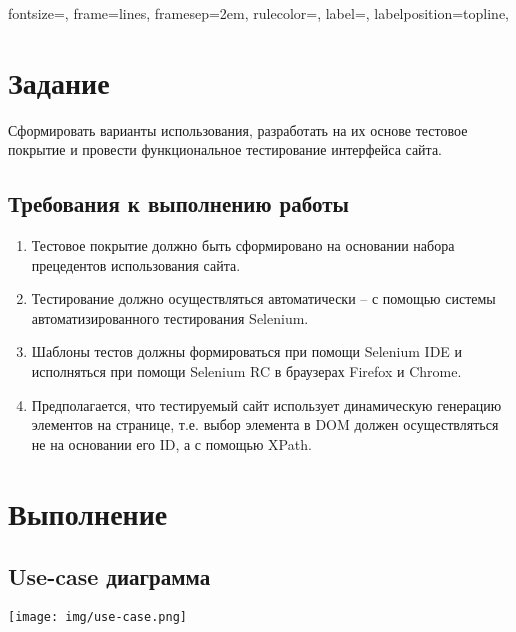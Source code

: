 
\isonefalse
\def \labnum {3}
\def \labsubj {Тестирование программного обеспечения}
\def \labauthor {Айтуганов Д. А. \\ Чебыкин И. Б.}
\def \labgroup {P3301}
\isinspfalse
\def \labinsp {}
\def \labname {Вариант: 12345 drive2.ru}
\isnametrue

\usepackage{graphicx}
\usepackage{verbatim}
\usepackage[dvipsnames]{xcolor}

\usepackage{fancyvrb}

 {
 fontsize=\scriptsize,
 frame=lines,  %
 framesep=2em, %
 rulecolor=\color{Gray},
 label=,
 labelposition=topline,
}



\section{Задание}
Сформировать варианты использования, разработать на их основе тестовое
покрытие и провести функциональное тестирование интерфейса сайта.

\subsection{Требования к выполнению работы}
\begin{enumerate}
\item Тестовое покрытие должно быть сформировано на основании набора
прецедентов использования сайта.
\item Тестирование должно осуществляться автоматически -- с помощью системы
автоматизированного тестирования Selenium.
\item Шаблоны тестов должны формироваться при помощи Selenium IDE и исполняться
при помощи Selenium RC в браузерах Firefox и Chrome.
\item Предполагается, что тестируемый сайт использует динамическую генерацию
элементов на странице, т.е. выбор элемента в DOM должен осуществляться не на
основании его ID, а с помощью XPath.
\end{enumerate}

\section{Выполнение}

\subsection{Use-case диаграмма}
\texttt{[image: img/use-case.png]}
